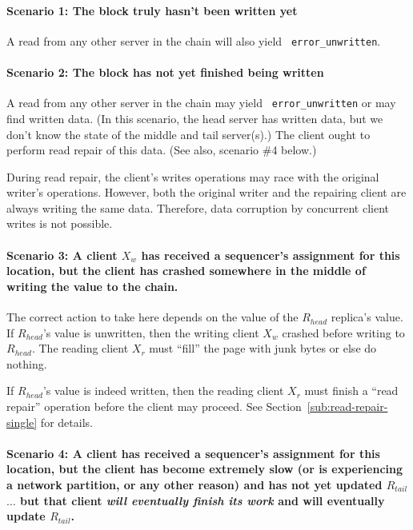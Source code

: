 \documentclass[preprint,10pt]{sigplanconf}
\begin{document}
\paragraph{Scenario 1: The block truly hasn't been written yet}

A read from any other server in the chain will also yield {\tt
  error\_unwritten}.

\paragraph{Scenario 2: The block has not yet finished being written}

A read from any other server in the chain may yield {\tt
  error\_unwritten} or may find written data.  (In this scenario, the
head server has written data, but we don't know the state of the middle
and tail server(s).)  The client ought to perform read repair of this
data.  (See also, scenario \#4 below.)

During read repair, the client's writes operations may race with the
original writer's operations.  However, both the original writer and
the repairing client are always writing the same data.  Therefore,
data corruption by concurrent client writes is not possible.

\paragraph{Scenario 3: A client $X_w$ has received a sequencer's
  assignment for this
  location, but the client has crashed somewhere in the middle of
  writing the value to the chain.}

The correct action to take here depends on the value of the $R_{head}$
replica's value.  If $R_{head}$'s value is unwritten, then the writing
client $X_w$ crashed before writing to $R_{head}$.  The reading client
$X_r$ must ``fill'' the page with junk bytes or else do nothing.

If $R_{head}$'s value is indeed written, then the reading client $X_r$
must finish a ``read repair'' operation before the client may proceed.
See Section~\ref{sub:read-repair-single} for details.

\paragraph{Scenario 4: A client has received a sequencer's assignment for this
  location, but the client has become extremely slow (or is
  experiencing a network partition, or any other reason) and has not
  yet updated $R_{tail}$ $\ldots$ but that client {\em will eventually
    finish its work} and will eventually update $R_{tail}$.}
\end{document}
